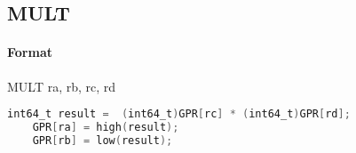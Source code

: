 \subsection{MULT}


\paragraph{Format} MULT ra, rb, rc, rd

\begin{lstlisting}[language=C]
    int64_t result =  (int64_t)GPR[rc] * (int64_t)GPR[rd];
    GPR[ra] = high(result);
    GPR[rb] = low(result);
\end{lstlisting}